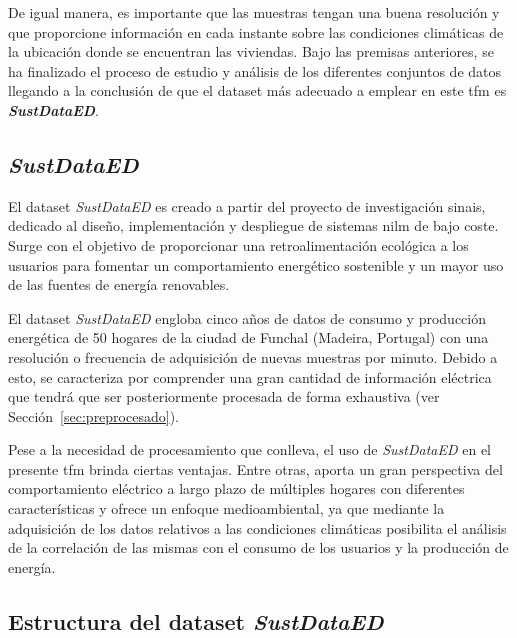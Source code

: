 \vspace{3mm}

De igual manera, es importante que las muestras tengan una buena resolución y que proporcione información en cada instante sobre las condiciones climáticas de la ubicación donde se encuentran las viviendas. Bajo las premisas anteriores, se ha finalizado el proceso de estudio y análisis de los diferentes conjuntos de datos llegando a la conclusión de que el dataset más adecuado a emplear en este \gls{tfm} es \textit{\textbf{SustDataED}}.

\subsection{\textit{SustDataED}}
\label{sec:sustdataed}

El dataset \textit{SustDataED} \cite{sustdata} es creado a partir del proyecto de investigación \gls{sinais}, dedicado al diseño, implementación y despliegue de sistemas \gls{nilm} de bajo coste. Surge con el objetivo de proporcionar una retroalimentación ecológica a los usuarios para fomentar un comportamiento energético sostenible y un mayor uso de las fuentes de energía renovables.

\vspace{3mm}

El dataset \textit{SustDataED} engloba cinco años de datos de consumo y producción energética de 50 hogares de la ciudad de Funchal (Madeira, Portugal) con una resolución o frecuencia de adquisición de nuevas muestras por minuto. Debido a esto, se caracteriza por comprender una gran cantidad de información eléctrica que tendrá que ser posteriormente procesada de forma exhaustiva (ver Sección~\ref{sec:preprocesado}).

\vspace{3mm}

Pese a la necesidad de procesamiento que conlleva, el uso de \textit{SustDataED} en el presente \gls{tfm} brinda ciertas ventajas. Entre otras, aporta un gran perspectiva del comportamiento eléctrico a largo plazo de múltiples hogares con diferentes características y ofrece un enfoque medioambiental, ya que mediante la adquisición de los datos relativos a las condiciones climáticas posibilita el análisis de la correlación de las mismas con el consumo de los usuarios y la producción de energía.

\subsection{Estructura del dataset \textit{SustDataED}}
\label{sec:estructurasustdata}

